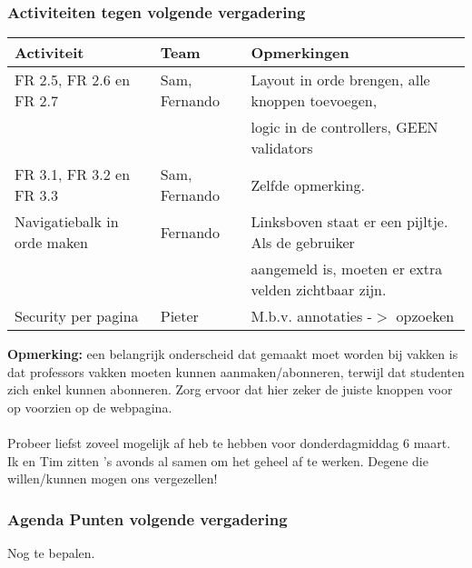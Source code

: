 \subsubsection{Activiteiten tegen volgende vergadering} \label{sec:TODOActiviteiten}
\begin{table} [H]
	\centering
	\begin{tabular} {l|l|l}
		\textbf{Activiteit} & \textbf{Team} & \textbf{Opmerkingen} \\
		\hline
		FR 2.5, FR 2.6 en FR 2.7 & Sam, Fernando & Layout in orde brengen, alle knoppen toevoegen, \\
		& & logic in de controllers, GEEN validators \\
		FR 3.1, FR 3.2 en FR 3.3 & Sam, Fernando & Zelfde opmerking. \\
		Navigatiebalk in orde maken & Fernando & Linksboven staat er een pijltje. Als de gebruiker \\
		& & aangemeld is, moeten er extra velden zichtbaar zijn. \\
		Security per pagina & Pieter & M.b.v. annotaties -$>$ opzoeken \\
	\end{tabular}
\end{table}
\textbf{Opmerking:} een belangrijk onderscheid dat gemaakt moet worden bij vakken is dat professors vakken moeten kunnen aanmaken/abonneren, terwijl dat studenten zich enkel kunnen abonneren. Zorg ervoor dat hier zeker de juiste knoppen voor op voorzien op de webpagina.
\\
\\
Probeer liefst zoveel mogelijk af heb te hebben voor donderdagmiddag 6 maart. Ik en Tim zitten 's avonds al samen om het geheel af te werken. Degene die willen/kunnen mogen ons vergezellen!

\subsubsection{Agenda Punten volgende vergadering}
Nog te bepalen.
